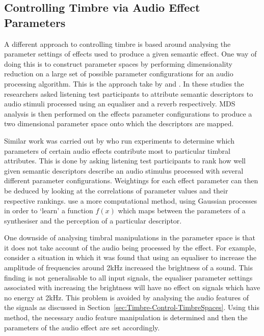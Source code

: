 	\subsection{Controlling Timbre via Audio Effect Parameters}
	\label{sec:Timbre-Control-ParameterSpaces}
		A different approach to controlling timbre is based around analysing the parameter settings of effects used
		to produce a given semantic effect. One way of doing this is to construct parameter spaces by performing
		dimensionality reduction on a large set of possible parameter configurations for an audio processing
		algorithm. This is the approach take by \citet{cartwright2013socialeq} and
		\citet{seetharaman2014crowdsourcing}. In these studies the researchers asked listening test participants to
		attribute semantic descriptors to audio stimuli processed using an equaliser and a reverb respectively. MDS
		analysis is then performed on the effects parameter configurations to produce a two dimensional parameter
		space onto which the descriptors are mapped.

		Similar work was carried out by \citet{sabin2011weighting} who run experiments to determine which
		parameters of certain audio effects contribute most to particular timbral attributes. This is done by
		asking listening test participants to rank how well given semantic descriptors describe an audio stimulus
		processed with several different parameter configurations. Weightings for each effect parameter can then be
		deduced by looking at the correlations of parameter values and their respective rankings.
		\citet{huang2014active} use a more computational method, using Gaussian processes in order to `learn' a
		function $f(x)$ which maps between the parameters of a synthesiser and the perception of a particular
		descriptor.

		One downside of analysing timbral manipulations in the parameter space is that it does not take account of
		the audio being processed by the effect. For example, consider a situation in which it was found that using
		an equaliser to increase the amplitude of frequencies around 2kHz increased the brightness of a sound. This
		finding is not generalisable to all input signals, the equaliser parameter settings associated with
		increasing the brightness will have no effect on signals which have no energy at 2kHz. This problem is
		avoided by analysing the audio features of the signals as discussed in
		Section~\ref{sec:Timbre-Control-TimbreSpaces}. Using this method, the necessary audio feature manipulation
		is determined and then the parameters of the audio effect are set accordingly.

